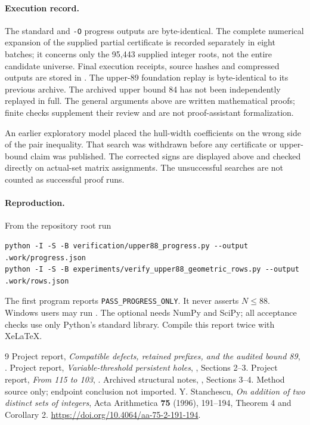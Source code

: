 \documentclass[11pt,a4paper]{article}
\begin{document}
\paragraph{Execution record.}
The standard and \texttt{-O} progress outputs are byte-identical.
The complete numerical expansion of the supplied partial certificate is
recorded separately in eight batches; it concerns only the 95,443 supplied
integer roots, not the entire candidate universe. Final execution receipts,
source hashes and compressed outputs are stored in
.
The upper-89 foundation replay is byte-identical to its previous archive.
The archived upper bound 84 has not been independently replayed in full.
The general arguments above are written mathematical proofs; finite checks
supplement their review and are not proof-assistant formalization.

An earlier exploratory model placed the hull-width coefficients on the
wrong side of the pair inequality. That search was withdrawn before any
certificate or upper-bound claim was published. The corrected signs are
displayed above and checked directly on actual-set matrix assignments.
The unsuccessful searches are not counted as successful proof runs.

\paragraph{Reproduction.}
From the repository root run
{\footnotesize
\begin{verbatim}
python -I -S -B verification/upper88_progress.py --output .work/progress.json
python -I -S -B experiments/verify_upper88_geometric_rows.py --output .work/rows.json
\end{verbatim}
}
The first program reports \texttt{PASS\_PROGRESS\_ONLY}.
It never asserts $N\le88$. Windows users may run
.
The optional  needs NumPy and
SciPy; all acceptance checks use only Python's standard library.
Compile this report twice with XeLaTeX.

\begin{thebibliography}{9}
 Project report, \emph{Compatible defects, retained prefixes,
and the audited bound 89}, .
 Project report, \emph{Variable-threshold persistent holes},
, Sections 2--3.
 Project report, \emph{From 115 to 103},
.
 Archived structural notes,
,
Sections 3--4. Method source only; endpoint conclusion not imported.
 Y. Stanchescu, \emph{On addition of two distinct sets of
integers}, Acta Arithmetica \textbf{75} (1996), 191--194,
Theorem 4 and Corollary 2. \url{https://doi.org/10.4064/aa-75-2-191-194}.
\end{thebibliography}
\end{document}
